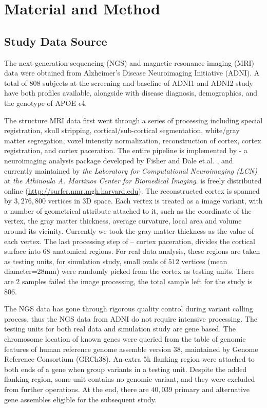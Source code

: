 \section{Material and Method}

\subsection{Study Data Source}
The next generation sequencing (NGS) and magnetic resonance imaging (MRI) data were obtained from Alzheimer’s Disease Neuroimaging Initiative (ADNI). A total of 808 subjects at the screening and baseline of ADNI1 and ADNI2 study have both profiles available, alongside with disease diagnosis, demographics, and the genotype of APOE $\epsilon$4. 

The structure MRI data first went through a series of processing including special registration, skull stripping, cortical/sub-cortical segmentation, white/gray matter segregation, voxel intensity normalization, reconstruction of cortex, cortex registration, and cortex paceration. The entire pipeline is implemented by \FS - a neuroimaging analysis package developed by Fisher and Dale et.al. \cite{FS:Intro}, and currently maintained by \textit{the Laboratory for Computational Neuroimaging (LCN)}  at \textit {the Athinoula A. Martinos Center for Biomedical Imaging}. \FS is freely distributed online (\url{http://surfer.nmr.mgh.harvard.edu}). The reconstructed cortex is spanned by $3,276,800$ vertices in 3D space. Each vertex is treated as a image variant, with a number of geometrical attribute attached to it, such as the coordinate of the vertex, the gray matter thickness, average curvature, local area and volume around its vicinity. Currently we took the gray matter thickness as the value of each vertex. The last processing step of \FS -- cortex paceration, divides the cortical surface into 68 anatomical regions. For real data analysis, these regions are taken as testing units, for simulation study, small ovals of $512$ vertices (mean diameter=28mm) were randomly picked from the cortex as testing units. There are 2 samples failed the image processing, the total sample left for the study is 806.

The NGS data has gone through rigorous quality control during variant calling process, thus the NGS data from ADNI do not require intensive processing. The testing units for both real data and simulation study are gene based. The chromosome location of known genes were queried from the table of genomic features of human reference genome assemble version 38, maintained by Genome Reference Consortium (GRCh38). An extra 5k flanking region were attached to both ends of a gene when group variants in a testing unit. Despite the added flanking region, some unit contains no genomic variant, and they were excluded from further operations. At the end, there are $40,039$ primary and alternative gene assembles eligible for the subsequent study.


